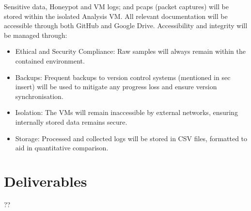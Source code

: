\documentclass[a4paper,12pt,oneside]{book}			%
\begin{document}
Sensitive data, Honeypot and VM logs; and pcaps (packet captures) will be stored within the isolated Analysis VM. All relevant documentation will be accessible through both GitHub and Google Drive. Accessibility and integrity will be managed through:

\begin{itemize}
	\item Ethical and Security Compliance: Raw samples will always remain within the contained environment.
	\item Backups: Frequent backups to version control systems (mentioned in sec insert) will be used to mitigate any progress loss and ensure version synchronisation. 
	\item Isolation: The VMs will remain inaccessible by external networks, ensuring internally stored data remains secure.
	\item Storage: Processed and collected logs will be stored in CSV files, formatted to aid in quantitative comparison.
\end{itemize}


\section{Deliverables}\label{sec: deliverables}

??


\printbibliography
\end{document}
